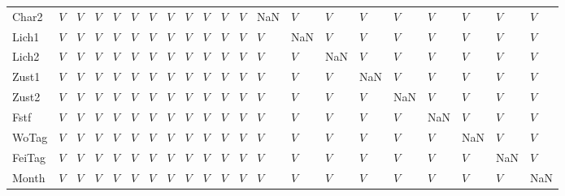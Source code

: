 \begin{tabular}{lllllllllllllllllllll}
Char2   &     $V$ &  $V$ &  $V$ &   $V$ &   $V$ &   $V$ &   $V$ &   $V$ &   $V$ &   $V$ &   $V$ &   NaN &   $V$ &   $V$ &   $V$ &   $V$ &  $V$ &   $V$ &    $V$ &   $V$ \\
Lich1   &     $V$ &  $V$ &  $V$ &   $V$ &   $V$ &   $V$ &   $V$ &   $V$ &   $V$ &   $V$ &   $V$ &   $V$ &   NaN &   $V$ &   $V$ &   $V$ &  $V$ &   $V$ &    $V$ &   $V$ \\
Lich2   &     $V$ &  $V$ &  $V$ &   $V$ &   $V$ &   $V$ &   $V$ &   $V$ &   $V$ &   $V$ &   $V$ &   $V$ &   $V$ &   NaN &   $V$ &   $V$ &  $V$ &   $V$ &    $V$ &   $V$ \\
Zust1   &     $V$ &  $V$ &  $V$ &   $V$ &   $V$ &   $V$ &   $V$ &   $V$ &   $V$ &   $V$ &   $V$ &   $V$ &   $V$ &   $V$ &   NaN &   $V$ &  $V$ &   $V$ &    $V$ &   $V$ \\
Zust2   &     $V$ &  $V$ &  $V$ &   $V$ &   $V$ &   $V$ &   $V$ &   $V$ &   $V$ &   $V$ &   $V$ &   $V$ &   $V$ &   $V$ &   $V$ &   NaN &  $V$ &   $V$ &    $V$ &   $V$ \\
Fstf    &     $V$ &  $V$ &  $V$ &   $V$ &   $V$ &   $V$ &   $V$ &   $V$ &   $V$ &   $V$ &   $V$ &   $V$ &   $V$ &   $V$ &   $V$ &   $V$ &  NaN &   $V$ &    $V$ &   $V$ \\
WoTag   &     $V$ &  $V$ &  $V$ &   $V$ &   $V$ &   $V$ &   $V$ &   $V$ &   $V$ &   $V$ &   $V$ &   $V$ &   $V$ &   $V$ &   $V$ &   $V$ &  $V$ &   NaN &    $V$ &   $V$ \\
FeiTag  &     $V$ &  $V$ &  $V$ &   $V$ &   $V$ &   $V$ &   $V$ &   $V$ &   $V$ &   $V$ &   $V$ &   $V$ &   $V$ &   $V$ &   $V$ &   $V$ &  $V$ &   $V$ &    NaN &   $V$ \\
Month   &     $V$ &  $V$ &  $V$ &   $V$ &   $V$ &   $V$ &   $V$ &   $V$ &   $V$ &   $V$ &   $V$ &   $V$ &   $V$ &   $V$ &   $V$ &   $V$ &  $V$ &   $V$ &    $V$ &   NaN \\
\bottomrule
\end{tabular}
